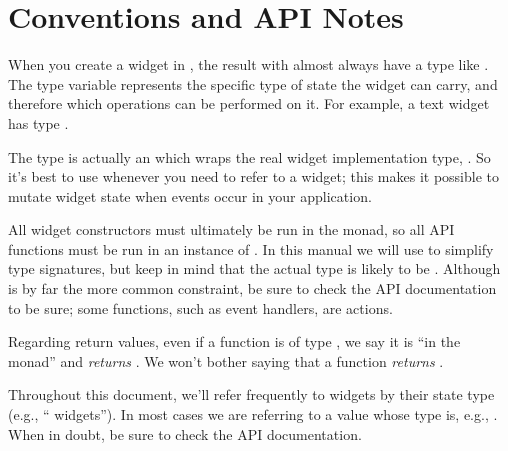 \section{Conventions and API Notes}

When you create a widget in \vtyui, the result with almost always have
a type like .  The type variable  represents the
specific type of state the widget can carry, and therefore which
operations can be performed on it.  For example, a text widget has
type .

The  type is actually an  which wraps the real
widget implementation type, .  So it's best to use
 whenever you need to refer to a widget; this makes it
possible to mutate widget state when events occur in your application.

All widget constructors must ultimately be run in the  monad,
so all API functions must be run in an instance of .  In
this manual we will use  to simplify type signatures, but keep
in mind that the actual type is likely to be .
Although  is by far the more common constraint, be sure to
check the API documentation to be sure; some functions, such as event
handlers, are  actions.

Regarding return values, even if a function is of type , we say it is ``in the  monad'' and \textit{returns}
.  We won't bother saying that a function \textit{returns }.

Throughout this document, we'll refer frequently to widgets by their
state type (e.g., `` widgets''). In most cases we are
referring to a value whose type is, e.g., .  When in
doubt, be sure to check the API documentation.
